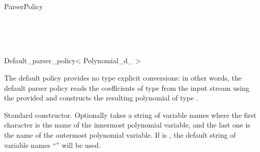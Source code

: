 \begin{ccRefConcept}{ParserPolicy}
\ccSeeAlso

\ccHasModels

\\
\\
\\

\end{ccRefConcept}

\begin{ccRefClass} {Default_parser_policy< Polynomial_d_ >}

\ccDefinition
The default policy provides no type explicit conversions: in other words, the default parser
policy reads the coefficients of type  from the input
stream using the provided  and constructs the resulting polynomial of type .


\ccIsModel
{}

\ccTypes

\ccGlue
{}\ccGlue


\ccCreation
{}

{Standard constructor. Optionally takes a string of variable names  
where the first character is the name of the innermost polynomial variable, and the last one 
is the name of the outermost polynomial variable. If  is , the default
string of variable names ``'' will be used.}

\ccSeeAlso
{}\\
\\


\end{ccRefClass}

